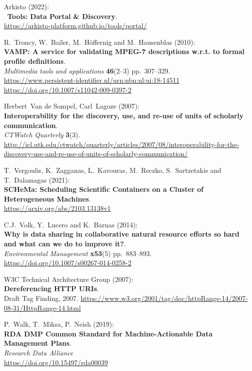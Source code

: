 \begin{thebibliography}{9}
\bibitem[Arkisto 2022]
Arkisto (2022):\\
~\textbf{Tools: Data Portal \& Discovery}.\\
\url{https://arkisto-platform.github.io/tools/portal/}

R.~Troncy, W.~Bailer, M.~Höffernig and M.~Hausenblas (2010):\\
\textbf{VAMP: A service for validating MPEG-7 descriptions w.r.t. to
formal profile definitions}.\\
\emph{Multimedia tools and applications} \textbf{46}(2--3)
pp.~307--329.\\
\url{https://www.persistent-identifier.nl/urn:nbn:nl:ui:18-14511}\\
\url{https://doi.org/10.1007/s11042-009-0397-2}

Herbert~Van de Sompel, Carl~Lagoze (2007):\\
\textbf{Interoperability for the discovery, use, and re-use of units of
scholarly communication}.\\
\emph{CTWatch Quarterly} \textbf{3}(3).\\
\url{http://icl.utk.edu/ctwatch/quarterly/articles/2007/08/interoperability-for-the-discovery-use-and-re-use-of-units-of-scholarly-communication/}

T.~Vergoulis, K.~Zagganas, L.~Kavouras, M.~Reczko,
S.~Sartzetakis and T.~Dalamagas (2021):\\
\textbf{SCHeMa: Scheduling Scientific Containers on a Cluster of
Heterogeneous Machines}.\\
\url{https://arxiv.org/abs/2103.13138v1}

C.J.~Volk, Y.~Lucero and K.~Barnas (2014):\\
\textbf{Why is data sharing in collaborative natural resource efforts so
hard and what can we do to improve it?}.\\
\emph{Environmental Management} \textbf{x53}(5) pp.~883--893.\\
\url{https://doi.org/10.1007/s00267-014-0258-2}

W3C Technical Architecture Group (2007):\\
\textbf{Dereferencing HTTP URIs}.\\
Draft Tag Finding, 2007.
\url{https://www.w3.org/2001/tag/doc/httpRange-14/2007-08-31/HttpRange-14.html}

P.~Walk, T.~Miksa, P.~Neish (2019):\\
\textbf{RDA DMP Common Standard for Machine-Actionable Data Management
Plans}.\\
\emph{Research Data Alliance}\\
\url{https://doi.org/10.15497/rda00039}


\end{thebibliography}
